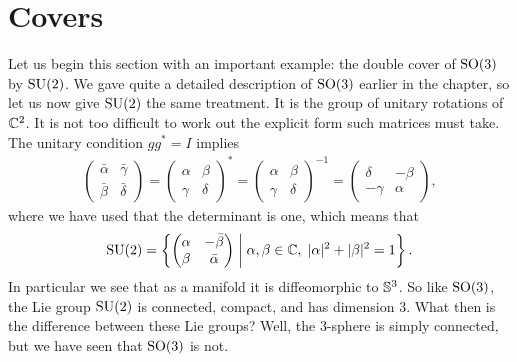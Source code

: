 \section{Covers}

Let us begin this section with an important example: the double cover of $\mathrm{SO}(3)$ by $\mathrm{SU}(2)$.
We gave quite a detailed description of $\mathrm{SO}(3)$ earlier in the chapter, so let us now give $\mathrm{SU}(2)$ the same treatment.
It is the group of unitary rotations of $\mathbb{C}^2$.
It is not too difficult to work out the explicit form such matrices must take.
The unitary condition $gg^\ast = I$ implies
\begin{align*}
\begin{pmatrix}
\bar{\alpha} & \bar{\gamma} \\ \bar{\beta} & \bar{\delta}
\end{pmatrix}
=
\begin{pmatrix}
\alpha & \beta \\ \gamma & \delta
\end{pmatrix}^\ast
= \begin{pmatrix}
\alpha & \beta \\ \gamma & \delta
\end{pmatrix}^{-1}
= \begin{pmatrix}
\delta & - \beta \\ - \gamma & \alpha
\end{pmatrix},
\end{align*}
where we have used that the determinant is one, which means that
\[
\mathrm{SU}(2) 
= \left\{ \begin{pmatrix} \alpha & -\bar{\beta} \\ \beta & \bar{\alpha} \end{pmatrix} \;\middle|\; \alpha,\beta \in \mathbb{C},\; |\alpha|^2 + |\beta|^2 = 1 \right\}.
\]
In particular we see that as a manifold it is diffeomorphic to $\mathbb{S}^3$.
So like $\mathrm{SO}(3)$, the Lie group $\mathrm{SU}(2)$ is connected, compact, and has dimension 3.
What then is the difference between these Lie groups?
Well, the $3$-sphere is simply connected, but we have seen that $\mathrm{SO}(3)$ is not.


